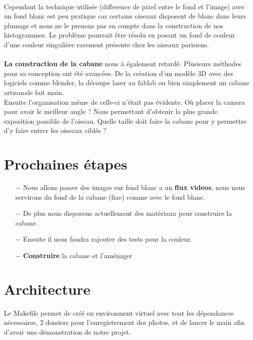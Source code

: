 \documentclass{article}
\begin{document}
\paragraph {}
Cependant la technique utilisée (difference de pixel entre le fond et l'image) avec un fond blanc est peu pratique car certains oiseaux disposent de blanc dans leurs plumage et nous ne le prenons pas en compte dans la construction de nos histogrammes. Le problème pourrait être résolu en posant un fond de couleur d'une couleur singulière rarement présente chez les oiseaux parisiens. \\
\paragraph {}
\textbf{La construction de la cabane} nous à également retardé. Plusieurs méthodes pour sa conception ont été avancées. De la création d'un modèle 3D avec des logiciels comme blender, la découpe laser au fablab ou bien simplement un cabane artisanale fait main. \\
Ensuite l'organisation même de celle-ci n'était pas évidente. Où placer la camera pour avoir le meilleur angle ? Nous permettant d'obtenir la plus grande exposition possible de l'oiseau. Quelle taille doit faire la cabane pour y permettre d'y faire entrer les oiseaux ciblés ? 

\section{Prochaines étapes}

\begin{itemize}
   \item[$-$] Nous allons passer des images sur fond blanc a un \textbf{flux videos}, nous nous servirons du fond de la cabane (fixe) comme avec le fond blanc. 
   \item[$-$] De plus nous disposons actuellement des matériaux pour construire la cabane. 
   \item[$-$] Ensuite il nous faudra rajouter des tests pour la couleur.
   \item[$-$] \textbf{Construire} la cabane et l'aménager
\end{itemize}

\section{Architecture}


\paragraph{}
Le Makefile permet de créé en environment virtuel avec tout les dépendances nécessaires, 2 dossiers pour l'enregistrement des photos, et de lancer le main afin d'avoir une démonstration de notre projet.\\
\end{document}
